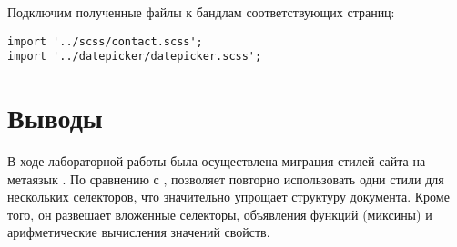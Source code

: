\documentclass[a4paper,14pt]{extarticle}
\begin{document}
Подключим полученные файлы к бандлам соответствующих страниц:

\begin{lstlisting}
import '../scss/contact.scss';
import '../datepicker/datepicker.scss';
\end{lstlisting}

\section*{Выводы}
В ходе лабораторной работы была осуществлена миграция стилей сайта на
метаязык . По сравнению с ,  позволяет
повторно использовать одни стили для нескольких селекторов, что значительно
упрощает структуру документа. Кроме того, он развешает вложенные селекторы,
объявления функций (миксины) и арифметические вычисления значений свойств.
\end{document}
